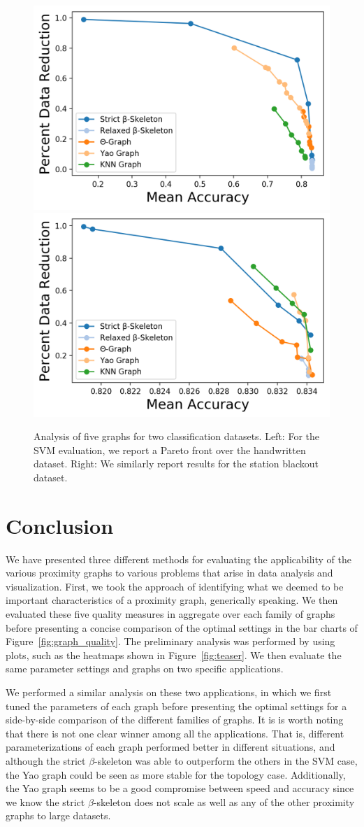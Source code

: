\begin{figure}[ht]
    \centering
    \includegraphics[width=0.45\linewidth]{figs/chap7/pareto_letters.png}
    \includegraphics[width=0.45\linewidth]{figs/chap7/pareto_sbo.png}
    \caption[Trade-off analysis of graphs for SVM classification]{Analysis of five graphs for two classification datasets.
    Left: For the SVM evaluation, we report a Pareto front over the handwritten dataset.
    Right: We similarly report results for the station blackout dataset.}
    \label{fig:graph_svm}
\end{figure}

\section{Conclusion}
We have presented three different methods for evaluating the applicability of the various proximity graphs to various problems that arise in data analysis and visualization.
%
First, we took the approach of identifying what we deemed to be important characteristics of a proximity graph, generically speaking.
%
We then evaluated these five quality measures in aggregate over each family of graphs before presenting a concise comparison of the optimal settings in the bar charts of Figure~\ref{fig:graph_quality}.
%
The preliminary analysis was performed by using plots, such as the heatmaps shown in Figure~\ref{fig:teaser}.
%
We then evaluate the same parameter settings and graphs on two specific applications.

We performed a similar analysis on these two applications, in which we first tuned the parameters of each graph before presenting the optimal settings for a side-by-side comparison of the different families of graphs.
%
It is is worth noting that there is not one clear winner among all the applications.
%
That is, different parameterizations of each graph performed better in different situations, and although the strict $\beta$-skeleton was able to outperform the others in the SVM case, the Yao graph could be seen as more stable for the topology case.
%
Additionally, the Yao graph seems to be a good compromise between speed and accuracy since we know the strict $\beta$-skeleton does not scale as well as any of the other proximity graphs to large datasets.

